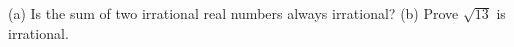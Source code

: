 (a) Is the sum of two irrational real numbers always irrational? (b) Prove $\sqrt{13}$ is irrational.
